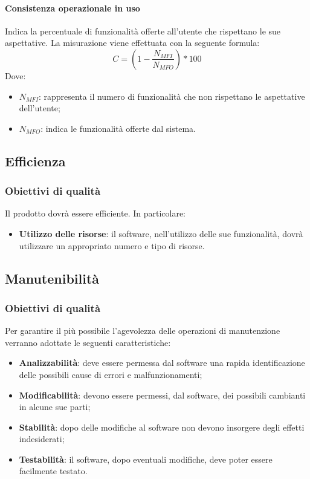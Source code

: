 \documentclass[../PianoDiQualifica.tex]{subfiles}
\begin{document}
				\paragraph{Consistenza operazionale in uso}
				Indica la percentuale di funzionalità offerte all'utente che rispettano le sue aspettative. La misurazione viene effettuata con la seguente formula:
				\begin{equation*}
					C = (1 - \frac{N_{MFI}}{N_{MFO}}) * 100
				\end{equation*}
				Dove:
				\begin{itemize}
					\item \textbf{$N_{MFI}$}:  rappresenta il numero di funzionalità che non rispettano le aspettative dell'utente;
					\item \textbf{$	N_{MFO}$}:  indica le funzionalità offerte dal sistema.
				\end{itemize}
				
			\subsection{Efficienza}
				\subsubsection{Obiettivi di qualità}
				Il prodotto dovrà essere efficiente. In particolare:
				\begin{itemize}
					\item \textbf{Utilizzo delle risorse}: il software, nell'utilizzo delle sue funzionalità, dovrà utilizzare un appropriato numero e tipo di risorse.
				\end{itemize}
			
	
			\subsection{Manutenibilità}
				\subsubsection{Obiettivi di qualità}
				Per garantire il più possibile l'agevolezza delle operazioni di manutenzione verranno adottate le seguenti caratteristiche:
				\begin{itemize}
					\item \textbf{Analizzabilità}: deve essere permessa dal software una rapida identificazione delle possibili cause di errori e malfunzionamenti;
					\item \textbf{Modificabilità}: devono essere permessi, dal software, dei possibili cambianti in alcune sue parti;
					\item \textbf{Stabilità}: dopo delle modifiche al software non devono insorgere degli effetti indesiderati;
					\item \textbf{Testabilità}: il software, dopo eventuali modifiche, deve poter essere facilmente testato.
				\end{itemize}
				
\end{document}
